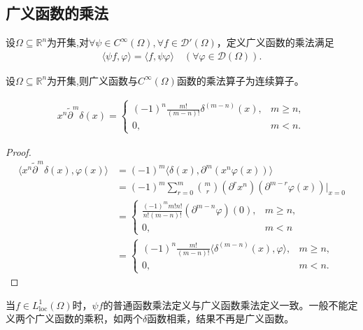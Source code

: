 \documentclass[../../main.tex]{subfiles}%
\begin{document}
\subsection{广义函数的乘法}

\begin{definition}
设$\Omega\subseteq\mathbb{R}^n$为开集,对$\forall\psi\in C^\infty(\Omega),\forall f\in\mathscr{D}'(\Omega)$，定义广义函数的乘法满足
\begin{align*}
\langle\psi f,\varphi\rangle=\langle f,\psi\varphi\rangle\quad(\forall\varphi\in\mathscr{D}(\Omega)).
\end{align*}
\end{definition}

\begin{proposition}
设$\Omega\subseteq\mathbb{R}^n$为开集,则广义函数与$C^\infty(\Omega)$函数的乘法算子为连续算子。
\end{proposition}

\begin{example}
\begin{align*}
x^n\widetilde{\partial}^m\delta(x)=
\begin{cases}
(-1)^n\frac{m!}{(m-n)!}\delta^{(m-n)}(x),&m\geqslant n,\\
0,&m<n.
\end{cases}
\end{align*}
\end{example}
\begin{proof}

\begin{align*}
\langle x^n\widetilde{\partial}^m\delta(x),\varphi(x)\rangle&=(-1)^m\langle\delta(x),\partial^m(x^n\varphi(x))\rangle\\
&=(-1)^m\sum\limits_{r=0}^m\binom{m}{r}(\partial^r x^n)(\partial^{m-r}\varphi(x))\bigg|_{x=0}\\
&=
\begin{cases}
\frac{(-1)^m m!n!}{n!(m-n)!}(\partial^{m-n}\varphi)(0),&m\geqslant n,\\
0,&m<n
\end{cases}\\
&=
\begin{cases}
(-1)^n\frac{m!}{(m-n)!}\langle\delta^{(m-n)}(x),\varphi\rangle,&m\geqslant n,\\
0,&m<n.
\end{cases}
\end{align*}

\end{proof}

\begin{remark}
当$f\in L^1_{\mathrm{loc}}(\Omega)$时，$\psi f$的普通函数乘法定义与广义函数乘法定义一致。一般不能定义两个广义函数的乘积，如两个$\delta$函数相乘，结果不再是广义函数。
\end{remark}
\end{document}
